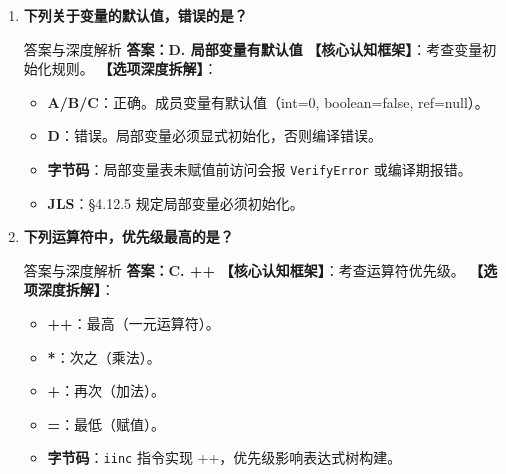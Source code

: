 \documentclass[12pt, a4paper]{ctexart}
\newcommand{\code}[1]{\texttt{\color{myblue}#1}}
\begin{document}
\begin{enumerate}[label=\arabic*.]
\begin{bluebox}{答案与深度解析}
\textbf{【应背诵知识点】}
\begin{itemize}[leftmargin=*, nosep]
    \item import 仅影响编译，不影响运行时
    \item java.lang 包自动导入，无需显式 import
    \item 同名类冲突需使用全限定名
\end{itemize}

\textbf{【命题趋势与实战策略】}
\begin{itemize}[leftmargin=*, nosep]
    \item \textbf{考场秒杀}：Java 导入必选 import
    \item \textbf{高频陷阱}：混淆 package 和 import 顺序
\end{itemize}
\end{bluebox}

\item \textbf{下列关于变量的默认值，错误的是？}
\begin{bluebox}{答案与深度解析}
\textbf{答案：D. 局部变量有默认值}
\textbf{【核心认知框架】}：考查变量初始化规则。
\textbf{【选项深度拆解】}：
\begin{itemize}[leftmargin=*, nosep]
    \item \textbf{A/B/C}：正确。成员变量有默认值（int=0, boolean=false, ref=null）。
    \item \textbf{D}：错误。局部变量必须显式初始化，否则编译错误。
    \item \textbf{字节码}：局部变量表未赋值前访问会报 \code{VerifyError} 或编译期报错。
    \item \textbf{JLS}：§4.12.5 规定局部变量必须初始化。
\end{itemize}
\end{bluebox}

\item \textbf{下列运算符中，优先级最高的是？}
\begin{bluebox}{答案与深度解析}
\textbf{答案：C. ++}
\textbf{【核心认知框架】}：考查运算符优先级。
\textbf{【选项深度拆解】}：
\begin{itemize}[leftmargin=*, nosep]
    \item \textbf{++}：最高（一元运算符）。
    \item \textbf{*}：次之（乘法）。
    \item \textbf{+}：再次（加法）。
    \item \textbf{=}：最低（赋值）。
    \item \textbf{字节码}：\code{iinc} 指令实现 ++，优先级影响表达式树构建。
\end{itemize}
\end{bluebox}


\end{enumerate}
\end{document}
